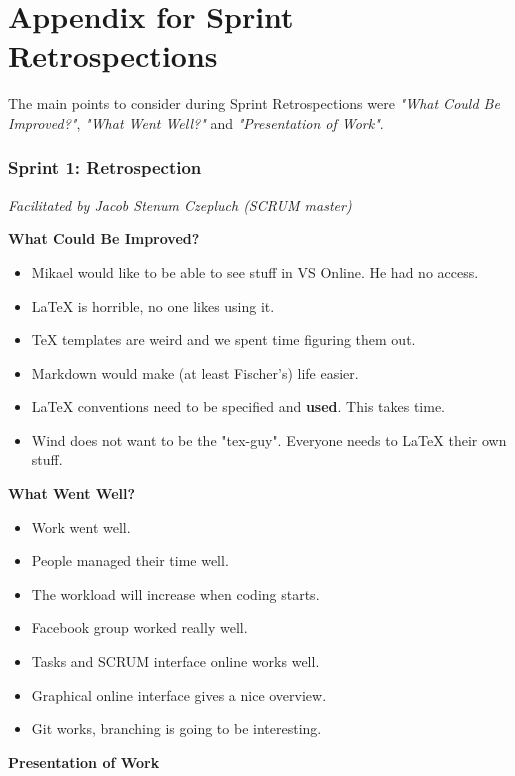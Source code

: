 \section{Appendix for Sprint Retrospections}
\label{sec:scrum-sprints}

The main points to consider during Sprint Retrospections were \textit{"What Could Be Improved?"}, \textit{"What Went Well?"} and \textit{"Presentation of Work"}.\\

\subsubsection{Sprint 1: Retrospection}
\label{sec:sprint1}
\small{\textit{Facilitated by Jacob Stenum Czepluch (SCRUM master)}} 

\textbf{What Could Be Improved?}

\begin{itemize}
	\item Mikael would like to be able to see stuff in VS Online. He had no access.
	\item LaTeX is horrible, no one likes using it.
	\item TeX templates are weird and we spent time figuring them out.
	\item Markdown would make (at least Fischer's) life easier. 
	\item LaTeX conventions need to be specified and \textbf{used}. This takes time.
	\item Wind does not want to be the "tex-guy". Everyone needs to LaTeX their own stuff.
\end{itemize}

\textbf{What Went Well?}

\begin{itemize}
	\item Work went well. 
	\item People managed their time well.
	\item The workload will increase when coding starts.
	\item Facebook group worked really well.
	\item Tasks and SCRUM interface online works well.
	\item Graphical online interface gives a nice overview.
	\item Git works, branching is going to be interesting. 
\end{itemize}

\textbf{Presentation of Work}

